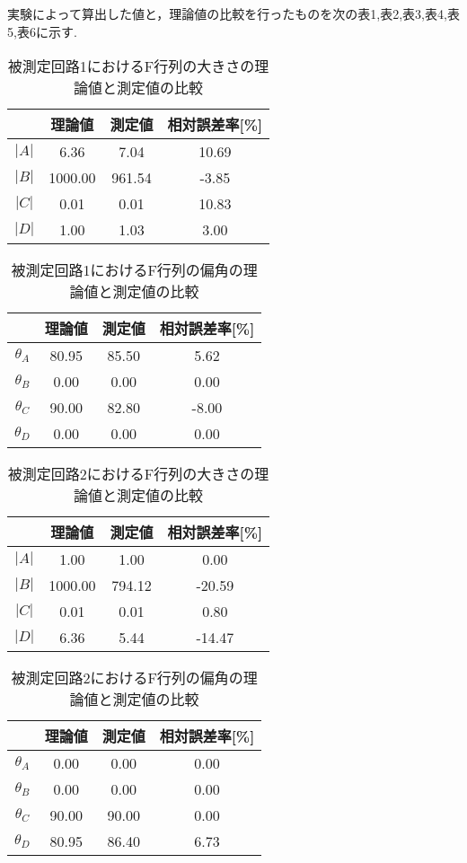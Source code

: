 実験によって算出した値と，理論値の比較を行ったものを次の表1,表2,表3,表4,表5,表6に示す.

\begin{table}[!ht]
    \centering
    \caption{被測定回路1におけるF行列の大きさの理論値と測定値の比較}
    \begin{tabular}{c|ccc}
    \hline
        & 理論値 & 測定値 & 相対誤差率[\%] \\ \hline
        $|A|$ & 6.36 & 7.04 & 10.69 \\ 
        $|B|$ & 1000.00 & 961.54 & -3.85 \\ 
        $|C|$ & 0.01 & 0.01 & 10.83 \\ 
        $|D|$ & 1.00 & 1.03 & 3.00 \\ \hline
    \end{tabular}
\end{table}

\begin{table}[!ht]
    \centering
    \caption{被測定回路1におけるF行列の偏角の理論値と測定値の比較}
    \begin{tabular}{c|ccc}
    \hline
        & 理論値 & 測定値 & 相対誤差率[\%] \\ \hline
        $\theta_A$ & 80.95 & 85.50 & 5.62 \\ 
        $\theta_B$ & 0.00 & 0.00 & 0.00 \\ 
        $\theta_C$ & 90.00 & 82.80 & -8.00 \\
        $\theta_D$ & 0.00 & 0.00 & 0.00 \\ \hline
    \end{tabular}
\end{table}

\begin{table}[!ht]
    \centering
    \caption{被測定回路2におけるF行列の大きさの理論値と測定値の比較}
    \begin{tabular}{c|ccc}
    \hline
        & 理論値 & 測定値 & 相対誤差率[\%] \\ \hline
        $|A|$ & 1.00 & 1.00 & 0.00 \\ 
        $|B|$ & 1000.00 & 794.12 & -20.59 \\ 
        $|C|$ & 0.01 & 0.01 & 0.80 \\ 
        $|D|$ & 6.36 & 5.44 & -14.47 \\ \hline
    \end{tabular}
\end{table}

\begin{table}[!ht]
    \centering
    \caption{被測定回路2におけるF行列の偏角の理論値と測定値の比較}
    \begin{tabular}{c|ccc}
    \hline
        & 理論値 & 測定値 & 相対誤差率[\%] \\ \hline
        $\theta_A$ & 0.00 & 0.00 & 0.00 \\ 
        $\theta_B$ & 0.00 & 0.00 & 0.00 \\ 
        $\theta_C$ & 90.00 & 90.00 & 0.00 \\
        $\theta_D$ & 80.95 & 86.40 & 6.73 \\ \hline
    \end{tabular}
\end{table}

